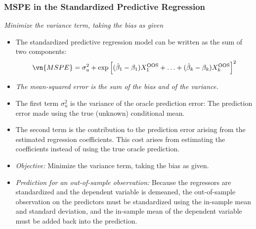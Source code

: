 \begin{frame}
\frametitle{MSPE in the Standardized Predictive Regression}
\emph{Minimize the variance term, taking the bias as given}
\begin{itemize}
\item The standardized predictive regression model can be written as the sum of two components:
\begin{align*}
\vn{MSPE} 
    = \sigma^{2}_{u} 
        + \exp\left[
              (\hat{\beta}_{1}-\beta_{1}) X_{1}^{\text{OOS}} 
            + \ldots
            + (\hat{\beta}_{k}-\beta_{k}) X_{k}^{\text{OOS}}
        \right]^{2}
\end{align*}
\item \emph{The mean-squared error is the sum of the bias and of the variance.}
\item The first term $\sigma^{2}_{u} $ is the variance of the oracle prediction error: The prediction error made using the true (unknown) conditional mean. 
\item The second term is the contribution to the prediction error arising from the estimated regression coefficients. This cost arises from estimating the coefficients instead of using the true oracle prediction.
\item \emph{Objective:} Minimize the variance term, taking the bias as given. 
\item \emph{Prediction for an out-of-sample observation:}
Because the regressors are standardized and the dependent variable is demeaned, the out-of-sample observation on the predictors must be standardized using the in-sample mean and standard deviation, and the in-sample mean of the dependent variable must be added back into the prediction.
\end{itemize}
\end{frame}


